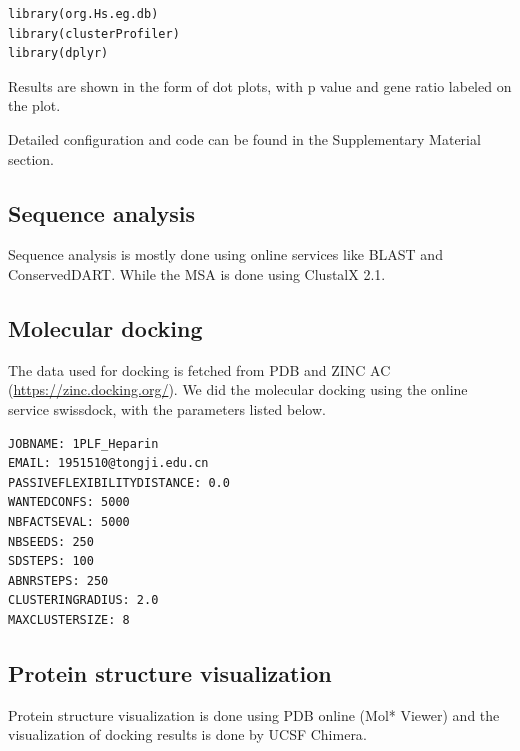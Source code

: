 \begin{lstlisting}
library(org.Hs.eg.db)
library(clusterProfiler)
library(dplyr)
\end{lstlisting}

Results are shown in the form of dot plots, with p value and gene ratio labeled on the plot.

Detailed configuration and code can be found in the Supplementary Material section.
\subsection{Sequence analysis}
Sequence analysis is mostly done using online services like BLAST and ConservedDART\cite{geer2002cdart}. While the MSA is done using ClustalX 2.1\cite{larkin2007clustal}.

\subsection{Molecular docking}
The data used for docking is fetched from PDB and ZINC AC\cite{irwin2005zinc} (\url{https://zinc.docking.org/}). We did the molecular docking using the online service swissdock\cite{grosdidier2011swissdock}, with the parameters listed below.
\begin{lstlisting}
JOBNAME: 1PLF_Heparin
EMAIL: 1951510@tongji.edu.cn
PASSIVEFLEXIBILITYDISTANCE: 0.0
WANTEDCONFS: 5000
NBFACTSEVAL: 5000
NBSEEDS: 250
SDSTEPS: 100
ABNRSTEPS: 250
CLUSTERINGRADIUS: 2.0
MAXCLUSTERSIZE: 8
\end{lstlisting}

\subsection{Protein structure visualization}
Protein structure visualization is done using PDB online (Mol* Viewer\cite{sehnal2021mol}) and the visualization of docking results is done by UCSF Chimera\cite{pettersen2004ucsf}.

